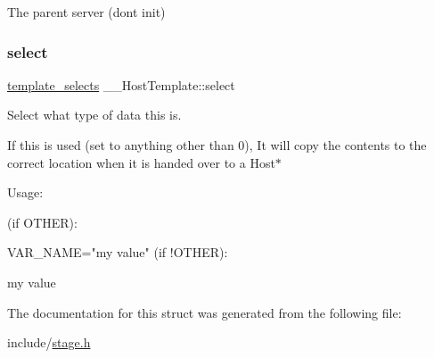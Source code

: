 The parent server (don\textquotesingle{}t init) 

\mbox{\label{struct_____host_template_ad1f4c7a1e25592181f63018195b4ff54}} 
\subsubsection{\texorpdfstring{select}{select}}
{\footnotesize\ttfamily \mbox{\hyperlink{stage_8h_a3ba89b32a5d51c086fa5dfa12e879f06}{template\+\_\+selects}} \+\_\+\+\_\+\+Host\+Template\+::select}



Select what type of data this is. 

If this is used (set to anything other than 0), It will copy the contents to the correct location when it is handed over to a Host$\ast$

Usage\+:

(if O\+T\+H\+ER)\+:
\begin{DoxyItemize}
\item V\+A\+R\+\_\+\+N\+A\+ME="my value" (if !\+O\+T\+H\+ER)\+:
\item my value 
\end{DoxyItemize}

The documentation for this struct was generated from the following file\+:\begin{DoxyCompactItemize}
\item 
include/\mbox{\hyperlink{stage_8h}{stage.\+h}}\end{DoxyCompactItemize}
